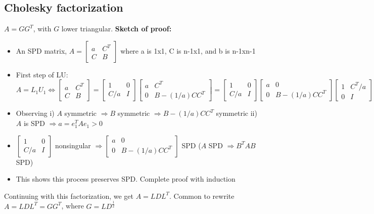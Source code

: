\documentclass{article}
\begin{document}
\subsection{Cholesky factorization}
$A = GG^T$, with $G$ lower triangular. \textbf{Sketch of proof:} 
\begin{itemize}
    \item An SPD matrix, $A = \begin{bmatrix} a & C^T\\ C &  B \end{bmatrix}$ where a is 1x1, C is n-1x1, and b is n-1xn-1
    \item First step of LU: $A = L_1U_1 \Longleftrightarrow \begin{bmatrix} a & C^T\\ C &  B \end{bmatrix} = \begin{bmatrix} 1 & 0\\ C/a &  I \end{bmatrix} \begin{bmatrix} a & C^T\\ 0 & B - (1/a)CC^T \end{bmatrix} = \begin{bmatrix} 1 & 0\\ C/a &  I\end{bmatrix} \begin{bmatrix} a & 0\\ 0 & B - (1/a)CC^T \end{bmatrix}
    \begin{bmatrix} 1 & C^T/a\\ 0 & I \end{bmatrix}$
    \item Observing i) $A$ symmetric $\Rightarrow B$ symmetric $\Rightarrow B - (1/a)CC^T$ symmetric ii) $A$ is SPD $\Longrightarrow a = e_1^TAe_1 > 0$
    \item $\begin{bmatrix} 1 & 0\\ C/a &  I\end{bmatrix}$ nonsingular $\Longrightarrow \begin{bmatrix} a & 0\\ 0 & B - (1/a)CC^T \end{bmatrix}$ SPD ($A$ SPD $\Rightarrow B^TAB$ SPD)
    \item This shows this process preserves SPD. Complete proof with induction
\end{itemize}
Continuing with this factorization, we get $A = LDL^T$. Common to rewrite $A = LDL^T = GG^T$, where $G = LD^{\frac{1}{2}}$
\end{document}
